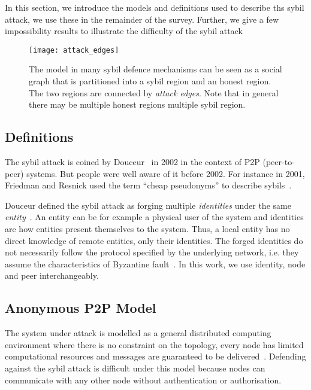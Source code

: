 In this section, we introduce the models and definitions used to describe ths
sybil attack, we use these in the remainder of the survey. Further, we give a
few impossibility results to illustrate the difficulty of the sybil attack

\begin{figure}
  \centering
  \texttt{[image: attack\_edges]}
  \caption{The model in many sybil defence mechanisms can be seen as a social
    graph that is partitioned into a sybil region and an honest region. The two
    regions are connected by \emph{attack edges}. Note that in general there may
    be multiple honest regions multiple sybil region. }
  \label{fig:attack-edge}
\end{figure}

\subsection{Definitions}
The sybil attack is coined by Douceur~\cite{douceur2002sybil} in 2002 in the
context of P2P (peer-to-peer) systems. But people were well aware of it before
2002. For instance in 2001, Friedman and Resnick used the term ``cheap
pseudonyms'' to describe sybils~\cite{resnick2001social}.

Douceur defined the sybil attack as forging multiple \emph{identities} under the
same \emph{entity}~\cite{douceur2002sybil}. An entity can be for example a
physical user of the system and identities are how entities present themselves
to the system. Thus, a local entity has no direct knowledge of remote entities,
only their identities. The forged identities do not necessarily follow the
protocol specified by the underlying network, i.e. they assume the
characteristics of Byzantine fault~\cite{lamport1982byzantine}. In this work, we
use identity, node and peer interchangeably.

\subsection{Anonymous P2P Model}
The system under attack is modelled as a general distributed computing
environment where there is no constraint on the topology, every node has limited
computational resources and messages are guaranteed to be
delivered~\cite{douceur2002sybil}. Defending against the sybil attack is
difficult under this model because nodes can communicate with any other node
without authentication or authorisation.


